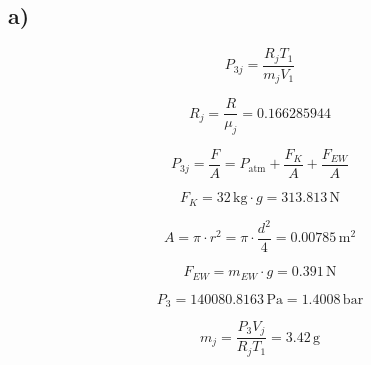 

\subsection*{a)}

\[
P_{3j} = \frac{R_j T_1}{m_j V_1}
\]

\[
R_j = \frac{R}{\mu_j} = 0.166285944
\]

\[
P_{3j} = \frac{F}{A} = P_{\text{atm}} + \frac{F_K}{A} + \frac{F_{EW}}{A}
\]

\[
F_K = 32 \, \text{kg} \cdot g = 313.813 \, \text{N}
\]

\[
A = \pi \cdot r^2 = \pi \cdot \frac{d^2}{4} = 0.00785 \, \text{m}^2
\]

\[
F_{EW} = m_{EW} \cdot g = 0.391 \, \text{N}
\]

\[
P_3 = 140080.8163 \, \text{Pa} = 1.4008 \, \text{bar}
\]

\[
m_j = \frac{P_3 V_j}{R_j T_1} = 3.42 \, \text{g}
\]